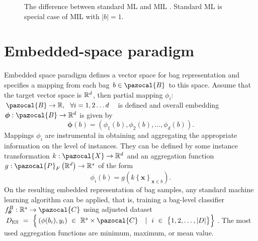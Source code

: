 \begin{figure}[h]
	\centering
	\caption{The difference between standard ML and MIL \cite{mandlik}. Standard ML is special case of MIL with $\vert b \vert = 1$. }%
	\label{ggm}%
\end{figure}
\section{Embedded-space paradigm}
Embedded space paradigm \cite{mandlik} defines a vector space for bag representation and specifies a mapping from each bag $b\in \pazocal{B}$ to this space. Assume that the target vector space is $\mathbb{R}^d$, then partial mapping $\phi_i$: $\pazocal{B} \to \R,~~\forall i=1,2\dots d$~~is defined and overall embedding $\boldsymbol{\phi}: \pazocal{B} \to \R^d $ is given by
\begin{equation}
	\boldsymbol{\phi}(b) = \left(\phi_1(b), \phi_2(b), \dots, \phi_d(b)\right).
\end{equation}
Mappings $\phi_i$ are instrumental in obtaining and aggregating the appropriate information on the level of instances. They can be defined by some instance transformation $k:\pazocal{X}\to \R^d$ and an aggregation function $g:\pazocal{P}_F\left(\R^d\right) \to \R^s$ of the form 
\begin{equation}
	\phi_i(b)=g\left( k\left\lbrace\boldsymbol{x}\right\rbrace_{\boldsymbol{x} \in b}\right).
\end{equation}
On the resulting embedded representation of bag samples, any standard machine learning algorithm can be applied, that is, training a bag-level classifier $f_{\boldsymbol{\theta}}^B :\R^s \to \pazocal{C}$ using adjusted dataset $D_{\mathrm{ES}}~=~\Big\lbrace \left(\phi(b_i), y_i\right)~\in~\R^s\times\pazocal{C}~\ ~|~\ i~\in~\big\lbrace 1,2,\dots,\vert D\vert\big\rbrace\Big\rbrace$. The most used aggregation functions are minimum, maximum, or mean value.
